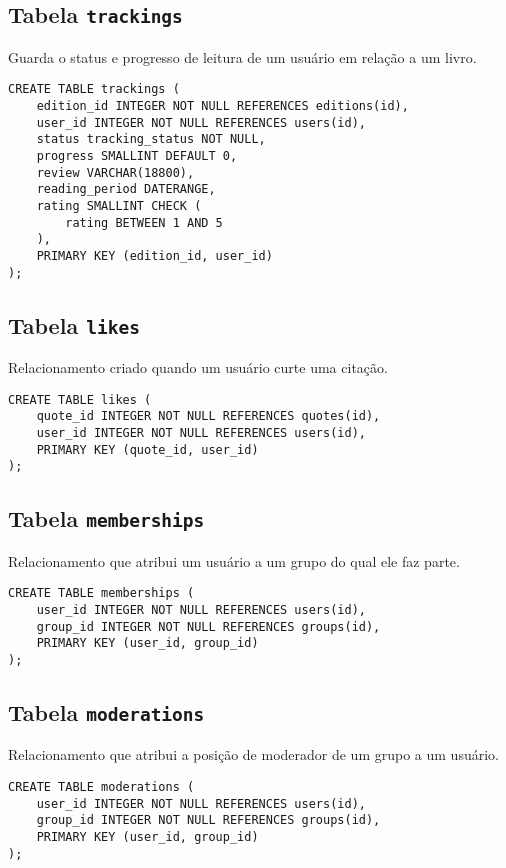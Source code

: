 \documentclass[12pt]{article}
\begin{document}
\newpage

\subsection{Tabela \texttt{trackings}}
Guarda o status e progresso de leitura de um usuário em relação a um livro.
\begin{lstlisting}
CREATE TABLE trackings (
    edition_id INTEGER NOT NULL REFERENCES editions(id),
    user_id INTEGER NOT NULL REFERENCES users(id),
    status tracking_status NOT NULL,
    progress SMALLINT DEFAULT 0,
    review VARCHAR(18800),
    reading_period DATERANGE,
    rating SMALLINT CHECK (
        rating BETWEEN 1 AND 5
    ),
    PRIMARY KEY (edition_id, user_id)
);
\end{lstlisting}

\subsection{Tabela \texttt{likes}}
Relacionamento criado quando um usuário curte uma citação.
\begin{lstlisting}
CREATE TABLE likes (
    quote_id INTEGER NOT NULL REFERENCES quotes(id),
    user_id INTEGER NOT NULL REFERENCES users(id),
    PRIMARY KEY (quote_id, user_id)
);
\end{lstlisting}

\subsection{Tabela \texttt{memberships}}
Relacionamento que atribui um usuário a um grupo do qual ele faz parte.
\begin{lstlisting}
CREATE TABLE memberships (
    user_id INTEGER NOT NULL REFERENCES users(id),
    group_id INTEGER NOT NULL REFERENCES groups(id),
    PRIMARY KEY (user_id, group_id)
);
\end{lstlisting}

\newpage

\subsection{Tabela \texttt{moderations}}
Relacionamento que atribui a posição de moderador de um grupo a um usuário.
\begin{lstlisting}
CREATE TABLE moderations (
    user_id INTEGER NOT NULL REFERENCES users(id),
    group_id INTEGER NOT NULL REFERENCES groups(id),
    PRIMARY KEY (user_id, group_id)
);
\end{lstlisting}
\end{document}
